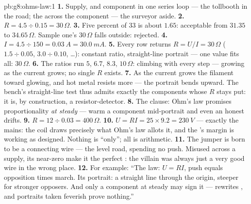 \begin{solution}{pb:g8:ohms-law:1}
\textbf{1.} Supply,  and component in one series loop
--- the tollbooth in the road; the  across the
component --- the surveyor aside.
\textbf{2.} $R = 4.5 \div 0.15 = 30\,\Omega$.
\textbf{3.} Five percent of $33$ is about $1.65$: acceptable
from $31.35$ to $34.65\,\Omega$. Sample one's $30\,\Omega$
falls outside: rejected.
\textbf{4.} $I = 4.5 \div 150 = \qty{0.03}{A} =
\qty{30.0}{mA}$.
\textbf{5.} Every row returns $R = U/I = 30\,\Omega$ ($1.5
\div 0.05$, $3.0 \div 0.10$, \dots): constant ratio,
straight-line portrait --- one value fits all: $30\,\Omega$.
\textbf{6.} The ratios run $5$, $6.7$, $8.3$, $10\,\Omega$:
climbing with every step ---  growing as the
current grows; no single $R$ exists.
\textbf{7.} As the current grows the filament  toward
glowing, and hot metal resists more --- the portrait bends
upward. The bench's straight-line test thus admits exactly
the components whose $R$ stays put: it is, by construction, a
resistor-detector.
\textbf{8.} The  clause: Ohm's law promises
proportionality \emph{at steady } --- warm a
component mid-portrait and even an honest  drifts.
\textbf{9.} $R = 12 \div 0.03 = 400\,\Omega$.
\textbf{10.} $U = R I = 25 \times 9.2 = \qty{230}{V}$ ---
exactly the mains: the coil draws precisely what Ohm's law
allots it, and the 's margin is working as designed.
Nothing is ``only''; all is arithmetic.
\textbf{11.} The jumper is born to be a connecting wire ---
the level road, spending no push. Misused across a supply, its
near-zero  make it the perfect : the villain
was always just a very good wire in the wrong place.
\textbf{12.} For example: ``The law: $U = R I$, push equals
opposition times march. Its portrait: a straight line through
the origin, steeper for stronger opposers. And only a
component at steady  may sign it ---  rewrites
, and portraits taken feverish prove nothing.''
\end{solution}
